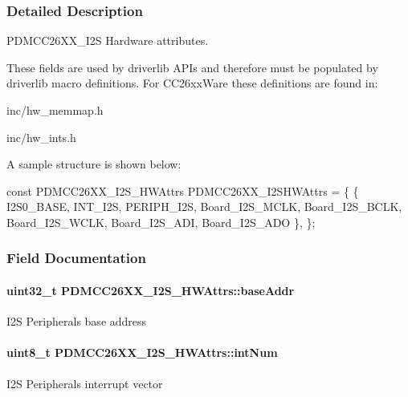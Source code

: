 \subsubsection{Detailed Description}
P\+D\+M\+C\+C26\+X\+X\+\_\+\+I2\+S Hardware attributes. 

These fields are used by driverlib A\+P\+Is and therefore must be populated by driverlib macro definitions. For C\+C26xx\+Ware these definitions are found in\+:
\begin{DoxyItemize}
\item inc/hw\+\_\+memmap.\+h
\item inc/hw\+\_\+ints.\+h
\end{DoxyItemize}

A sample structure is shown below\+: 
\begin{DoxyCode}
\textcolor{keyword}{const} PDMCC26XX_I2S_HWAttrs PDMCC26XX\_I2SHWAttrs = \{
    \{
        I2S0\_BASE,
        INT\_I2S,
        PERIPH\_I2S,
        Board\_I2S\_MCLK,
        Board\_I2S\_BCLK,
        Board\_I2S\_WCLK,
        Board\_I2S\_ADI,
        Board\_I2S\_ADO
    \},
\};
\end{DoxyCode}
 

\subsubsection{Field Documentation}
\paragraph[{base\+Addr}]{\setlength{\rightskip}{0pt plus 5cm}uint32\+\_\+t P\+D\+M\+C\+C26\+X\+X\+\_\+\+I2\+S\+\_\+\+H\+W\+Attrs\+::base\+Addr}\label{struct_p_d_m_c_c26_x_x___i2_s___h_w_attrs_af1366b2ec99c0c4b6f99a4f35eb0b1f5}
I2\+S Peripheral\textquotesingle{}s base address 
\paragraph[{int\+Num}]{\setlength{\rightskip}{0pt plus 5cm}uint8\+\_\+t P\+D\+M\+C\+C26\+X\+X\+\_\+\+I2\+S\+\_\+\+H\+W\+Attrs\+::int\+Num}\label{struct_p_d_m_c_c26_x_x___i2_s___h_w_attrs_acaa31ac5c7fdd2274bc81f4aba780301}
I2\+S Peripheral\textquotesingle{}s interrupt vector 
